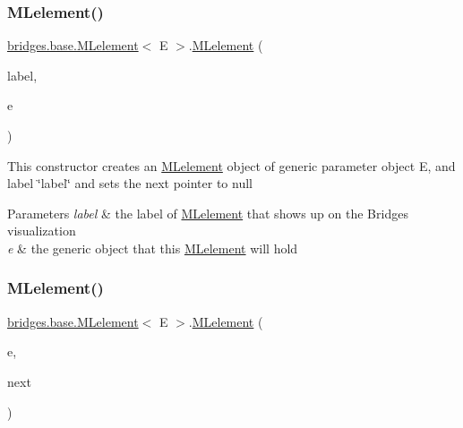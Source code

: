 \subsubsection{\texorpdfstring{M\+Lelement()}{MLelement()}\hspace{0.1cm}{\footnotesize\ttfamily [2/4]}}
{\footnotesize\ttfamily \hyperlink{classbridges_1_1base_1_1_m_lelement}{bridges.\+base.\+M\+Lelement}$<$ E $>$.\hyperlink{classbridges_1_1base_1_1_m_lelement}{M\+Lelement} (\begin{DoxyParamCaption}\item[{String}]{label,  }\item[{E}]{e }\end{DoxyParamCaption})}

This constructor creates an \hyperlink{classbridges_1_1base_1_1_m_lelement}{M\+Lelement} object of generic parameter object E, and label \char`\"{}label\char`\"{} and sets the next pointer to null


\begin{DoxyParams}{Parameters}
{\em label} & the label of \hyperlink{classbridges_1_1base_1_1_m_lelement}{M\+Lelement} that shows up on the Bridges visualization \\
\hline
{\em e} & the generic object that this \hyperlink{classbridges_1_1base_1_1_m_lelement}{M\+Lelement} will hold \\
\hline
\end{DoxyParams}
\mbox{\label{classbridges_1_1base_1_1_m_lelement_ad3d5fe59028cd6854eb2abceefad7f7d}} 
\subsubsection{\texorpdfstring{M\+Lelement()}{MLelement()}\hspace{0.1cm}{\footnotesize\ttfamily [3/4]}}
{\footnotesize\ttfamily \hyperlink{classbridges_1_1base_1_1_m_lelement}{bridges.\+base.\+M\+Lelement}$<$ E $>$.\hyperlink{classbridges_1_1base_1_1_m_lelement}{M\+Lelement} (\begin{DoxyParamCaption}\item[{E}]{e,  }\item[{\hyperlink{classbridges_1_1base_1_1_m_lelement}{M\+Lelement}$<$ E $>$}]{next }\end{DoxyParamCaption})}

